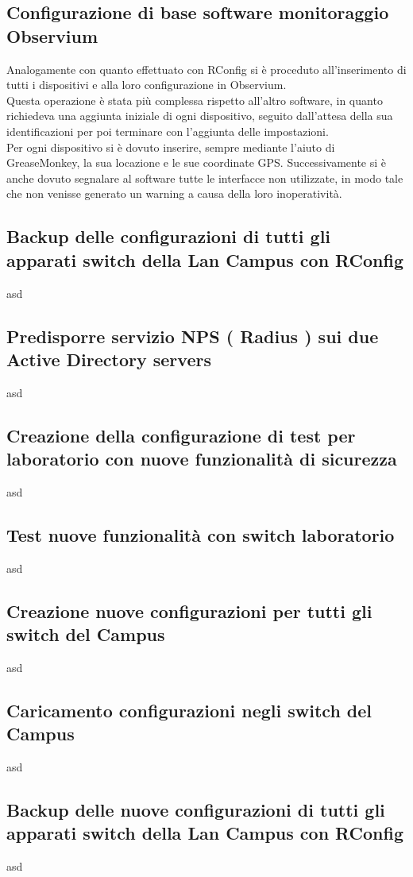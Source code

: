 \documentclass[Realizzazione.tex]{subfiles}
\begin{document}
\subsection{Configurazione di base software monitoraggio Observium}
Analogamente con quanto effettuato con RConfig si è proceduto all'inserimento di tutti i dispositivi e alla loro configurazione in Observium. \\
Questa operazione è stata più complessa rispetto all'altro software, in quanto richiedeva una aggiunta iniziale di ogni dispositivo, seguito dall'attesa della sua identificazioni per poi terminare con l'aggiunta delle impostazioni. \\
Per ogni dispositivo si è dovuto inserire, sempre mediante l'aiuto di GreaseMonkey, la sua locazione e le sue coordinate GPS. Successivamente si è anche dovuto segnalare al software tutte le interfacce non utilizzate, in modo tale che non venisse generato un warning a causa della loro inoperatività.

\subsection{Backup delle configurazioni di tutti gli apparati switch della Lan Campus con RConfig} 
asd
\subsection{Predisporre servizio NPS ( Radius ) sui due Active Directory servers} 
asd
\subsection{Creazione della configurazione di test per laboratorio con nuove funzionalità di sicurezza} 
asd
\subsection{Test nuove funzionalità con switch laboratorio} 
asd
\subsection{Creazione nuove configurazioni per tutti gli switch del Campus} 
asd
\subsection{Caricamento configurazioni negli switch del Campus} 
asd
\subsection{Backup delle nuove configurazioni di tutti gli apparati switch della Lan Campus con RConfig} 
asd
\end{document}
